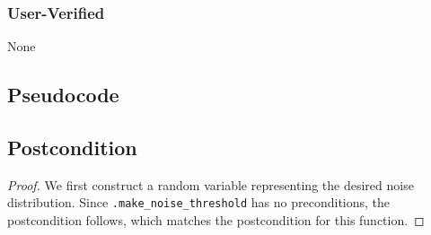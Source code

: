 \documentclass{article}
\begin{document}
\subsubsection*{User-Verified}
None

\subsection*{Pseudocode}


\subsection*{Postcondition}
\begin{theorem}
\end{theorem}

\begin{proof}
    We first construct a random variable  representing the desired noise distribution.
    Since \texttt{.make\_noise\_threshold} has no preconditions,
    the postcondition follows, which matches the postcondition for this function.
\end{proof}
\end{document}
